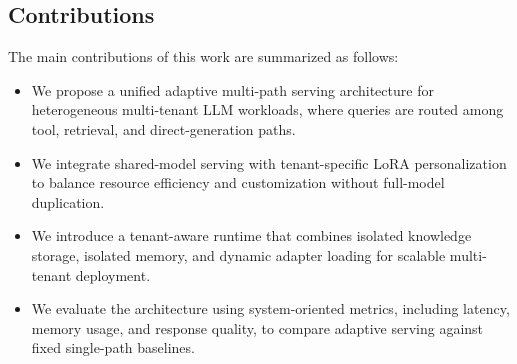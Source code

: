 \subsection{Contributions}

The main contributions of this work are summarized as follows:

\begin{itemize}
    \item We propose a unified adaptive multi-path serving architecture for heterogeneous multi-tenant LLM workloads, where queries are routed among tool, retrieval, and direct-generation paths.
    \item We integrate shared-model serving with tenant-specific LoRA personalization to balance resource efficiency and customization without full-model duplication.
    \item We introduce a tenant-aware runtime that combines isolated knowledge storage, isolated memory, and dynamic adapter loading for scalable multi-tenant deployment.
    \item We evaluate the architecture using system-oriented metrics, including latency, memory usage, and response quality, to compare adaptive serving against fixed single-path baselines.
\end{itemize}
